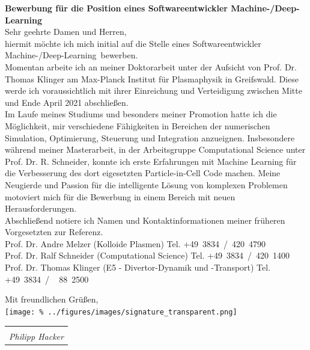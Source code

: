 \documentclass[11pt,a4paper]{moderncv}
\makeatletter
\newcommand{\position}{%
    Softwareentwickler Machine-/Deep-Learning}
\newcommand{\sign}[1]{%
  \begin{tabular}[t]{@{}l@{}}
  \makebox[1.5in]{\dotfill}\\
  \strut\emph{#1}\strut%
  \end{tabular}%
}
\makeatother
\begin{document}
    \vspace*{1.0cm}
    {\bfseries \color{familynamecolor}%
        Bewerbung für die Position eines \position%
    }\\[0.75cm]
%
    Sehr geehrte Damen und Herren,\\[0.5cm]
%
    hiermit möchte ich mich initial auf die Stelle eines \position~bewerben.\\[0.3cm]  %
%
    Momentan arbeite ich an meiner Doktorarbeit unter der Aufsicht von Prof. Dr. Thomas Klinger am Max-Planck Institut für Plasmaphysik in Greifswald. Diese werde ich voraussichtlich mit ihrer Einreichung und Verteidigung zwischen Mitte und Ende April 2021 abschließen.\\[0.2cm]%
%
    Im Laufe meines Studiums und besonders meiner Promotion hatte ich die Möglichkeit, mir verschiedene Fähigkeiten in Bereichen der numerischen Simulation, Optimierung, Steuerung und Integration anzueignen. Insbesondere während meiner Masterarbeit, in der Arbeitsgruppe Computational Science unter Prof. Dr. R. Schneider, konnte ich erste Erfahrungen mit Machine Learning für die Verbesserung des dort eigesetzten Particle-in-Cell Code machen. Meine Neugierde und Passion für die intelligente Lösung von komplexen Problemen motoviert mich für die Bewerbung in einem Bereich mit neuen Herausforderungen.\\[0.2cm]%
%
    Abschließend notiere ich Namen und Kontaktinformationen meiner früheren Vorgesetzten zur Referenz.\\[0.2cm]
    \hspace*{0.5cm}Prof. Dr. Andre Melzer (Kolloide Plasmen)%
        \hfill Tel. +49~3834~/~420~4790\\
    \hspace*{0.5cm}Prof. Dr. Ralf Schneider (Computational Science)%
        \hfill Tel. +49~3834~/~420~1400\\
    \hspace*{0.5cm}Prof. Dr. Thomas Klinger (E5 - Divertor-Dynamik und -Transport)%
        \hfill Tel. +49~3834~/~~\,88~2500\\
%
    \vspace*{0.3cm}
    \begin{flushleft}
        Mit freundlichen Grüßen,\\[0.75cm]
        \vspace*{-1.0cm}%
        \texttt{[image: \%
            ../figures/images/signature\_transparent.png]}
        \hspace*{-4.0cm}\sign{Philipp Hacker}\\[0.0cm]
    \end{flushleft}
%
    \newpage
    \pagestyle{fancy}
\end{document}
